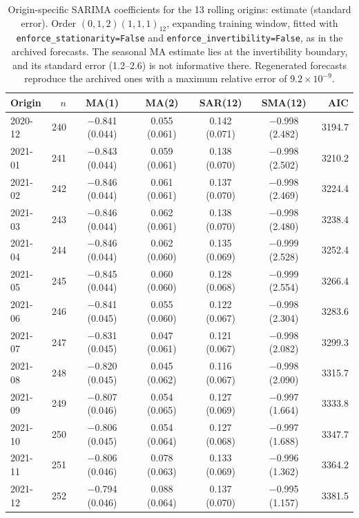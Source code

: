 \begin{table}[htbp]
\centering
\scriptsize
\caption{Origin-specific SARIMA coefficients for the 13 rolling origins: estimate (standard error). Order $(0,1,2)(1,1,1)_{12}$, expanding training window, fitted with \texttt{enforce\_stationarity=False} and \texttt{enforce\_invertibility=False}, as in the archived forecasts. The seasonal MA estimate lies at the invertibility boundary, and its standard error (1.2--2.6) is not informative there. Regenerated forecasts reproduce the archived ones with a maximum relative error of $9.2\times10^{-9}$.}
\label{tab:sarima}
\begingroup\setlength{\tabcolsep}{3pt}
\begin{tabular}{@{}lrccccr@{}}
\toprule
Origin & $n$ & MA(1) & MA(2) & SAR(12) & SMA(12) & AIC \\
\midrule
2020-12 & 240 & $-$0.841 (0.044) & 0.055 (0.061) & 0.142 (0.071) & $-$0.998 (2.482) & 3194.7 \\
2021-01 & 241 & $-$0.843 (0.044) & 0.059 (0.061) & 0.138 (0.070) & $-$0.998 (2.502) & 3210.2 \\
2021-02 & 242 & $-$0.846 (0.044) & 0.061 (0.061) & 0.137 (0.070) & $-$0.998 (2.469) & 3224.4 \\
2021-03 & 243 & $-$0.846 (0.044) & 0.062 (0.061) & 0.138 (0.070) & $-$0.998 (2.480) & 3238.4 \\
2021-04 & 244 & $-$0.846 (0.044) & 0.062 (0.060) & 0.135 (0.069) & $-$0.999 (2.528) & 3252.4 \\
2021-05 & 245 & $-$0.845 (0.044) & 0.060 (0.060) & 0.128 (0.068) & $-$0.999 (2.554) & 3266.4 \\
2021-06 & 246 & $-$0.841 (0.045) & 0.055 (0.060) & 0.122 (0.067) & $-$0.998 (2.304) & 3283.6 \\
2021-07 & 247 & $-$0.831 (0.045) & 0.047 (0.061) & 0.121 (0.067) & $-$0.998 (2.082) & 3299.3 \\
2021-08 & 248 & $-$0.820 (0.045) & 0.045 (0.062) & 0.116 (0.067) & $-$0.998 (2.090) & 3315.7 \\
2021-09 & 249 & $-$0.807 (0.046) & 0.054 (0.065) & 0.127 (0.069) & $-$0.997 (1.664) & 3333.8 \\
2021-10 & 250 & $-$0.806 (0.045) & 0.054 (0.064) & 0.127 (0.068) & $-$0.997 (1.688) & 3347.7 \\
2021-11 & 251 & $-$0.806 (0.046) & 0.078 (0.063) & 0.133 (0.069) & $-$0.996 (1.362) & 3364.2 \\
2021-12 & 252 & $-$0.794 (0.046) & 0.088 (0.064) & 0.137 (0.070) & $-$0.995 (1.157) & 3381.5 \\
\bottomrule
\end{tabular}
\endgroup
\end{table}
